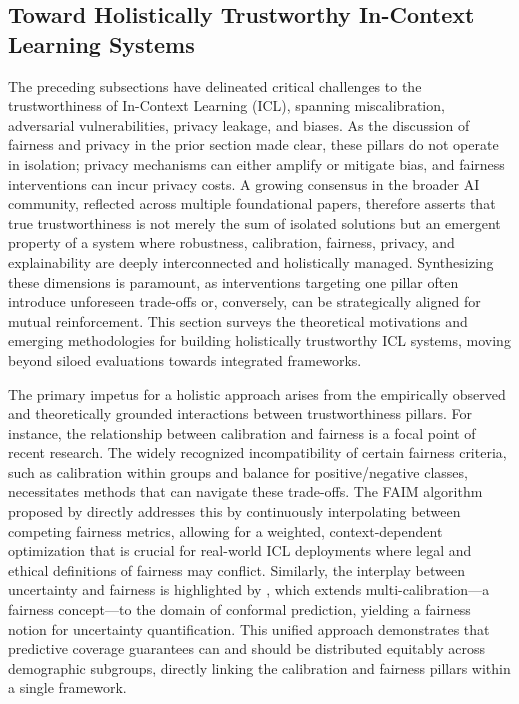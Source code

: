 \documentclass[11pt]{article}
\begin{document}
\subsection{Toward Holistically Trustworthy In-Context Learning Systems}

The preceding subsections have delineated critical challenges to the trustworthiness of In-Context Learning (ICL), spanning miscalibration, adversarial vulnerabilities, privacy leakage, and biases. As the discussion of fairness and privacy in the prior section made clear, these pillars do not operate in isolation; privacy mechanisms can either amplify or mitigate bias, and fairness interventions can incur privacy costs. A growing consensus in the broader AI community, reflected across multiple foundational papers, therefore asserts that true trustworthiness is not merely the sum of isolated solutions but an emergent property of a system where robustness, calibration, fairness, privacy, and explainability are deeply interconnected and holistically managed. Synthesizing these dimensions is paramount, as interventions targeting one pillar often introduce unforeseen trade-offs or, conversely, can be strategically aligned for mutual reinforcement. This section surveys the theoretical motivations and emerging methodologies for building holistically trustworthy ICL systems, moving beyond siloed evaluations towards integrated frameworks.

The primary impetus for a holistic approach arises from the empirically observed and theoretically grounded interactions between trustworthiness pillars. For instance, the relationship between calibration and fairness is a focal point of recent research. The widely recognized incompatibility of certain fairness criteria, such as calibration within groups and balance for positive/negative classes, necessitates methods that can navigate these trade-offs. The FAIM algorithm proposed by \cite{ref482} directly addresses this by continuously interpolating between competing fairness metrics, allowing for a weighted, context-dependent optimization that is crucial for real-world ICL deployments where legal and ethical definitions of fairness may conflict. Similarly, the interplay between uncertainty and fairness is highlighted by \cite{ref483}, which extends multi-calibration---a fairness concept---to the domain of conformal prediction, yielding a fairness notion for uncertainty quantification. This unified approach demonstrates that predictive coverage guarantees can and should be distributed equitably across demographic subgroups, directly linking the calibration and fairness pillars within a single framework.
\end{document}
